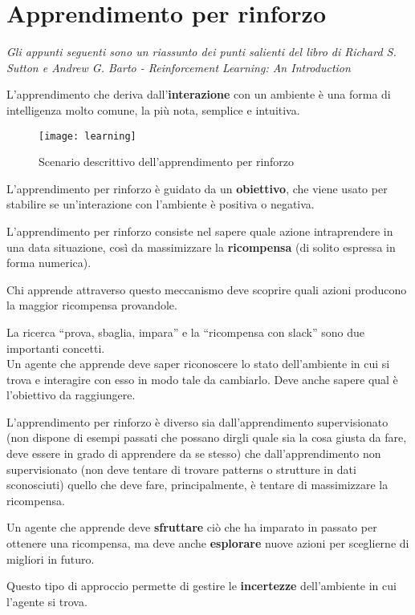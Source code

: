 \newpage
\section{Apprendimento per rinforzo}

\textit{Gli appunti seguenti sono un riassunto dei punti salienti
del libro di Richard S. Sutton e Andrew G. Barto - Reinforcement
Learning: An Introduction}

L'apprendimento che deriva dall'\textbf{interazione} con un ambiente è una
forma di intelligenza molto comune, la più nota, semplice e intuitiva.

\begin{figure}[H]
\centering
\texttt{[image: learning]}
\caption{Scenario descrittivo dell'apprendimento per rinforzo}
\end{figure}

L'apprendimento per rinforzo è guidato da un \textbf{obiettivo}, che viene
usato per stabilire se un'interazione con l'ambiente è positiva o negativa.

L'apprendimento per rinforzo consiste nel sapere quale azione intraprendere in
una data situazione, così da massimizzare la \textbf{ricompensa} (di solito
espressa in forma numerica).

Chi apprende attraverso questo meccanismo deve scoprire quali azioni producono
la maggior ricompensa provandole.

La ricerca ``prova, sbaglia, impara'' e la ``ricompensa con slack'' sono due
importanti concetti.\\

Un agente che apprende deve saper riconoscere lo stato dell'ambiente in cui si trova
e interagire con esso in modo tale da cambiarlo. Deve anche sapere qual è
l'obiettivo da raggiungere.

L'apprendimento per rinforzo è diverso sia dall'apprendimento supervisionato
(non dispone di esempi passati che possano dirgli quale sia la cosa giusta
da fare, deve essere in grado di apprendere da se stesso) che dall'apprendimento
non supervisionato (non deve tentare di trovare patterns o strutture in dati
sconosciuti) quello che deve fare, principalmente, è tentare di massimizzare
la ricompensa.

Un agente che apprende deve \textbf{sfruttare} ciò che ha imparato in passato per
ottenere una ricompensa, ma deve anche \textbf{esplorare} nuove azioni per sceglierne
di migliori in futuro.

Questo tipo di approccio permette di gestire le \textbf{incertezze} dell'ambiente in
cui l'agente si trova.

